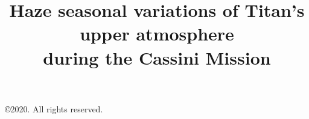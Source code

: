 \documentclass[manuscript,linenumbers]{aastex63}
\begin{document}
\small\copyright 2020. All rights reserved.

\title{Haze seasonal variations of Titan's upper atmosphere\\during the Cassini Mission}













\end{document}
